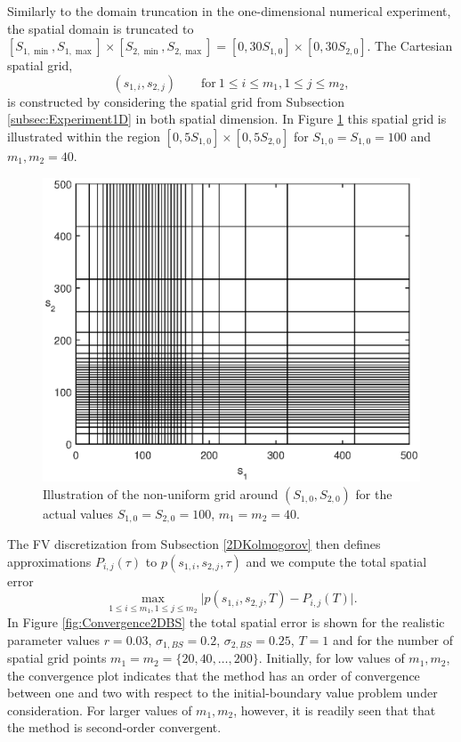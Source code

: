 \documentclass[10pt]{article}
\begin{document}
Similarly to the domain truncation in the one-dimensional numerical experiment, the spatial domain is truncated to $[S_{1,\min}, S_{1,\max}] \times [S_{2,\min}, S_{2,\max}] = [0, 30S_{1,0}] \times [0, 30S_{2,0}]$. The Cartesian spatial grid,
$$ (s_{1,i},s_{2,j}) \qquad \mathrm{for} \ 1 \le i \le m_{1}, 1 \le j \le m_{2}, $$ 
is constructed by considering the spatial grid from Subsection \ref{subsec:Experiment1D} in both spatial dimension. In Figure \ref{fig:Grid2DBS} this spatial grid is illustrated within the region  $[0, 5S_{1,0}] \times [0, 5S_{2,0}]$ for $S_{1,0} = S_{1,0} = 100$ and $m_{1}, m_{2} = 40$.
\begin{figure}
\begin{center}
\includegraphics[scale=0.5]{Grid2DBS.eps}  
\caption{Illustration of the non-uniform grid around $(S_{1,0},S_{2,0})$ for the actual values $S_{1,0}=S_{2,0}=100$, $m_{1}=m_{2}=40$.}
\label{fig:Grid2DBS}
\end{center}
\end{figure}
The FV discretization from Subsection \ref{2DKolmogorov} then defines approximations $P_{i,j}(\tau)$ to $p(s_{1,i},s_{2,j},\tau)$ and we compute the total spatial error
$$ \max_{1 \le i \le m_{1}, 1 \le j \le m_{2}} \vert p(s_{1,i},s_{2,j},T) - P_{i,j}(T) \vert. $$
In Figure \ref{fig:Convergence2DBS} the total spatial error is shown for the realistic parameter values $r= 0.03$, $\sigma_{1,BS}=0.2$, $\sigma_{2,BS}=0.25$, $T=1$ and for the number of spatial grid points $m_{1}=m_{2} = \{20,40, \ldots, 200 \}$. 
Initially, for low values of $m_{1},m_{2}$, the convergence plot indicates that the method has an order of convergence between one and two with respect to the initial-boundary value problem under consideration. For larger values of $m_{1},m_{2}$, however, it is readily seen that that the method is second-order convergent. 
\end{document}
